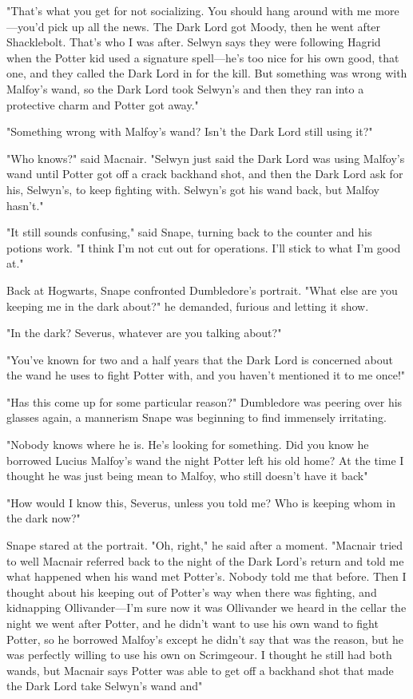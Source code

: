 "That's what you get for not socializing. You should hang around with me more—you'd pick up all the news. The Dark Lord got Moody, then he went after Shacklebolt. That's who I was after. Selwyn says they were following Hagrid when the Potter kid used a signature spell—he's too nice for his own good, that one, and they called the Dark Lord in for the kill. But something was wrong with Malfoy's wand, so the Dark Lord took Selwyn's and then they ran into a protective charm and Potter got away."

"Something wrong with Malfoy's wand? Isn't the Dark Lord still using it?"

"Who knows?" said Macnair. "Selwyn just said the Dark Lord was using Malfoy's wand until Potter got off a crack backhand shot, and then the Dark Lord ask for his, Selwyn's, to keep fighting with. Selwyn's got his wand back, but Malfoy hasn't."

"It still sounds confusing," said Snape, turning back to the counter and his potions work. "I think I'm not cut out for operations. I'll stick to what I'm good at."

Back at Hogwarts, Snape confronted Dumbledore's portrait. "What else are you keeping me in the dark about?" he demanded, furious and letting it show.

"In the dark? Severus, whatever are you talking about?"

"You've known for two and a half years that the Dark Lord is concerned about the wand he uses to fight Potter with, and you haven't mentioned it to me once!"

"Has this come up for some particular reason?" Dumbledore was peering over his glasses again, a mannerism Snape was beginning to find immensely irritating.

"Nobody knows where he is. He's looking for something. Did you know he borrowed Lucius Malfoy's wand the night Potter left his old home? At the time I thought he was just being mean to Malfoy, who still doesn't have it back{\el}"

"How would I know this, Severus, unless you told me? Who is keeping whom in the dark now?"

Snape stared at the portrait. "Oh, right," he said after a moment. "Macnair tried to{\el} well Macnair referred back to the night of the Dark Lord's return and told me what happened when his wand met Potter's. Nobody told me that before. Then I thought about his keeping out of Potter's way when there was fighting, and kidnapping Ollivander—I'm sure now it was Ollivander we heard in the cellar the night we went after Potter, and he didn't want to use his own wand to fight Potter, so he borrowed Malfoy's except he didn't say that was the reason, but he was perfectly willing to use his own on Scrimgeour. I thought he still had both wands, but Macnair says Potter was able to get off a backhand shot that made the Dark Lord take Selwyn's wand and{\el}"

